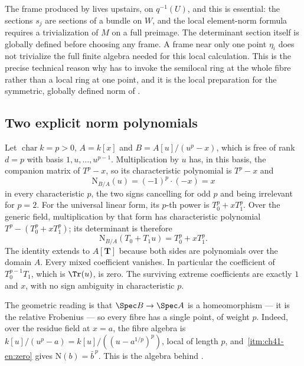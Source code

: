 \begin{remark}
\label{rem:ch41-frame-side}
The frame produced by  lives upstairs, on
$q^{-1}(U)$, and this is essential: the sections $s_j$ are sections of a
bundle on $W$, and the local element-norm formula requires a trivialization of $M$ on
a full preimage.  The determinant section itself is globally defined
before choosing any frame.  A frame near only one point $\eta_i$ does not trivialize the full
finite algebra needed for this local calculation.  This is the precise technical reason why
 has to invoke the semilocal ring at the whole
fibre rather than a local ring at one point, and it is the local preparation for the symmetric, globally defined norm of
.
\end{remark}

\subsection{Two explicit norm polynomials}
\label{sec:ch41-norm-examples}

\begin{example}
\label{ex:ch41-cyclic-degree-p}
Let $\operatorname{char}k=p>0$, $A=k[x]$ and
$B=A[u]/(u^p-x)$, which is free of rank $d=p$ with basis
$1,u,\dots,u^{p-1}$.  Multiplication by $u$ has, in this basis, the
companion matrix of $T^p-x$, so its characteristic polynomial is
$T^p-x$ and
\[
 \mathrm N_{B/A}(u)=(-1)^p\cdot(-x)=x
\]
in every characteristic $p$, the two signs cancelling for odd $p$ and
being irrelevant for $p=2$.  For the universal linear form, its $p$-th power is
$T_0^p+xT_1^p$.  Over the generic field, multiplication by that form
has characteristic polynomial
$T^p-(T_0^p+xT_1^p)$; its determinant is therefore
\[
 \mathrm N_{B/A}(T_0+T_1u)=T_0^p+xT_1^p .
\]
The identity extends to $A[\mathbf T]$ because both sides are
polynomials over the domain $A$.  Every mixed coefficient vanishes.
In particular the coefficient of $T_0^{p-1}T_1$, which is
$\Tr(u)$, is zero.  The surviving extreme coefficients are exactly
$1$ and $x$, with no sign ambiguity in characteristic $p$.

The geometric reading is that $\Spec B\to\Spec A$ is a homeomorphism ---
it is the relative Frobenius --- so every fibre has a single point, of
weight $p$.  Indeed, over the residue field at $x=a$, the fibre algebra
is $k[u]/(u^p-a)=k[u]/((u-a^{1/p})^p)$, local of length $p$, and
\,\cref{itm:ch41-en:zero} gives
$\mathrm N(b)=\bar b^{\,p}$.  This is the algebra behind
.
\end{example}

